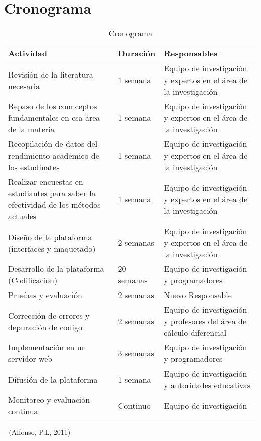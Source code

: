 \documentclass{article}
\begin{document}
\section{Cronograma}
\begin{table}[h]

  \centering
  \begin{tabular}{|p{4cm}|p{3cm}|p{5cm}|} 
  \hline 
  \textbf{Actividad} & \textbf{Duración} & \textbf{Responsables} \\ 
  \hline 
  Revisión de la literatura necesaria & 1 semana & Equipo de investigación y expertos en el área de la investigación\\
  \hline 
  Repaso de los connceptos fundamentales en esa área de la materia & 1 semana & Equipo de investigación y expertos en el área de la investigación\\
  \hline 
  Recopilación de datos del rendimiento académico de los estudinates& 1 semana & Equipo de investigación y expertos en el área de la investigación\\
  \hline
  Realizar encuestas en estudiantes para saber la efectividad de los métodos actuales & 1 semana & Equipo de investigación y expertos en el área de la investigación \\
  \hline 
  Diseño de la plataforma (interfaces y maquetado) & 2 semanas & Equipo de investigación y expertos en el área de la investigación\\ %
  \hline 
  Desarrollo de la plataforma (Codificación) & 20 semanas & Equipo de investigación y programadores \\ %
  \hline 
  Pruebas y evaluación  & 2 semanas & Nuevo Responsable \\ 
  \hline 
  Corrección de errores y depuración de codigo & 2 semanas & Equipo de investigación y profesores del área de cálculo diferencial\\ %
  \hline
  Implementación en un servidor web &3 semanas &Equipo de investigación y programadores\\
  \hline
  Difusión de la plataforma & 1 semana & Equipo de investigación y autoridades educativas\\
  \hline
  Monitoreo y evaluación continua & Continuo & Equipo de investigación\\
  \hline

  \end{tabular}
  \caption{Cronograma} 
  \label{tabla_ejemplo} 
  \cite{Alfonso} - (Alfonso, P.L, 2011)
\end{table}
\end{document}
